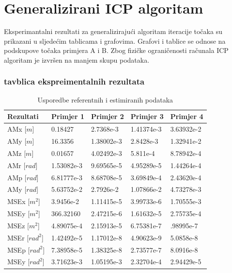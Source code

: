 \section{Generalizirani ICP algoritam}
Eksperimantalni rezultati za generalizirajući algoritam iteracije točaka su prikazani u sljedećim tablicama i grafovima. Grafovi i tablice se odnose na podskupove točaka primjera A i B. Zbog fizičke ograničenosti računala ICP algoritam je izvršen na manjem skupu podataka.

\subsubsection{tavblica ekspreimentalnih rezultata}
\begin{table}[H]
  \begin{tabular}{ |p{3cm}| |p{2cm}|p{2cm}|p{2cm}|p{2cm}| }
    \hline
    Rezultati& Primjer 1& Primjer 2&Primjer 3& Primjer 4\\
    \hline
    AMx [$m$]& 0.18427& 2.7368e-3& 1.41374e-3& 3.63932e-2\\
    AMy [$m$]&  16.3356& 1.38002e-3& 2.8428e-3& 1.32941e-2\\
    AMz [$m$]& 0.01657& 4.02492e-3& 5.811e-4& 8.78942e-4\\
    AMr [$rad$]& 1.53082e-3& 9.69565e-5& 4.95289e-5& 1.44264e-4\\
    AMp [$rad$]& 6.81777e-3& 8.68708e-5& 3.69849e-4& 2.43620e-4\\
    AMy [$rad$]& 5.63752e-2& 2.7926e-2& 1.07866e-2& 4.73278e-3\\
    \hline
    MSEx [$m^2$]& 3.9456e-2& 1.11415e-5& 3.99733e-6& 1.70555e-3\\
    MSEy [$m^2$]& 366.32160& 2.47215e-6& 1.61632e-5& 2.75735e-4\\
    MSEz [$m^2$]& 4.89075e-4& 2.15913e-5& 6.75381e-7& .98995e-7\\
    MSEr [$rad^2$]& 1.42492e-5& 1.17012e-8& 4.90623e-9& 5.0858e-8\\
    MSEp [$rad^2$]& 7.38958e-5& 1.38325e-8& 2.73577e-7& 8.0916e-8\\
    MSEy [$rad^2$]& 3.71623e-3& 1.05195e-3& 2.32704e-4& 2.94429e-5\\
    \hline
  \end{tabular}
  \caption{Usporedbe referentnih i estimiranih podataka}
  \label{res:ref_est_table}
\end{table}
\pagebreak
